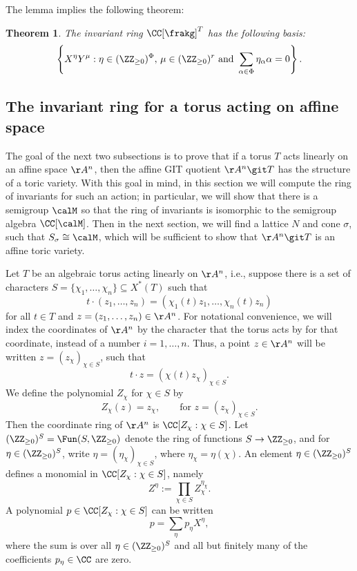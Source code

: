 \documentclass[12pt]{amsart}
\theoremstyle{plain}
\newtheorem{theorem}{Theorem}%
\begin{document}
The lemma implies the following theorem:

\begin{theorem}\label{invringbasis}
    The invariant ring $\CC[\frakg]^T$ has the following basis:
    $$\left\{ X^\eta Y^\mu :\eta \in (\ZZ_{\ge0})^{\Phi}, \, \mu \in (\ZZ_{\ge0})^r \text{ and }\sum_{\alpha\in\Phi} \eta_\alpha \alpha = 0\right\}.$$
\end{theorem}

\subsection{The invariant ring for a torus acting on affine space}
The goal of the next two subsections is to prove that if a torus $T$ acts linearly on an affine space $\AA^n$, then the affine GIT quotient $\AA^n \git T$ has the structure of a toric variety.
With this goal in mind, in this section we will compute the ring of invariants for such an action;
in particular, we will show that there is a semigroup $\calM$ so that the ring of invariants is isomorphic to the semigroup algebra $\CC[\calM]$.
Then in the next section, we will find a lattice $N$ and cone $\sigma$, such that $S_\sigma \cong \calM$, which will be sufficient to show that $\AA^n \git T$ is an affine toric variety.

Let $T$ be an algebraic torus acting linearly on $\AA^n$, i.e., suppose there is a set of characters $S = \{\chi_1, \ldots, \chi_n\} \subseteq X^*(T)$ such that
$$t \cdot (z_1, \ldots, z_n) = (\chi_1(t) z_1, \ldots, \chi_n(t) z_n)$$
for all $t \in T$ and $z = (z_1, \ldots, z_n) \in \AA^n$.
For notational convenience, we will index the coordinates of $\AA^n$ by the character that the torus acts by for that coordinate, instead of a number $i=1, \ldots, n$.
Thus, a point $z \in \AA^n$ will be written $z = (z_\chi)_{\chi\in S}$, such that
\begin{equation}\label{actiondef}
t \cdot z = (\chi(t) z_\chi)_{\chi \in S}.
\end{equation}
We define the polynomial $Z_\chi$ for $\chi \in S$ by
$$Z_\chi(z) = z_\chi, \qquad \text{for } z = (z_\chi)_{\chi \in S}.$$
Then the coordinate ring of $\AA^n$ is $\CC[Z_\chi : \chi \in S]$.
Let $(\ZZ_{\ge 0})^S = \Fun(S, \ZZ_{\ge 0})$ denote the ring of functions $S \to \ZZ_{\ge 0}$, and for $\eta \in (\ZZ_{\ge 0})^S$, write $\eta=(\eta_\chi)_{\chi\in S}$, where $\eta_\chi = \eta(\chi)$.
An element $\eta \in (\ZZ_{\ge 0})^S$ defines a monomial in $\CC[Z_\chi : \chi \in S]$, namely
$$Z^\eta := \prod_{\chi \in S} Z_\chi^{\eta_\chi}.$$
A polynomial $p \in \CC[Z_\chi : \chi \in S]$ can be written
$$p = \sum_\eta p_\eta X^\eta,$$
where the sum is over all $\eta \in (\ZZ_{\ge 0})^S$ and all but finitely many of the coefficients $p_\eta \in \CC$ are zero.
\end{document}

